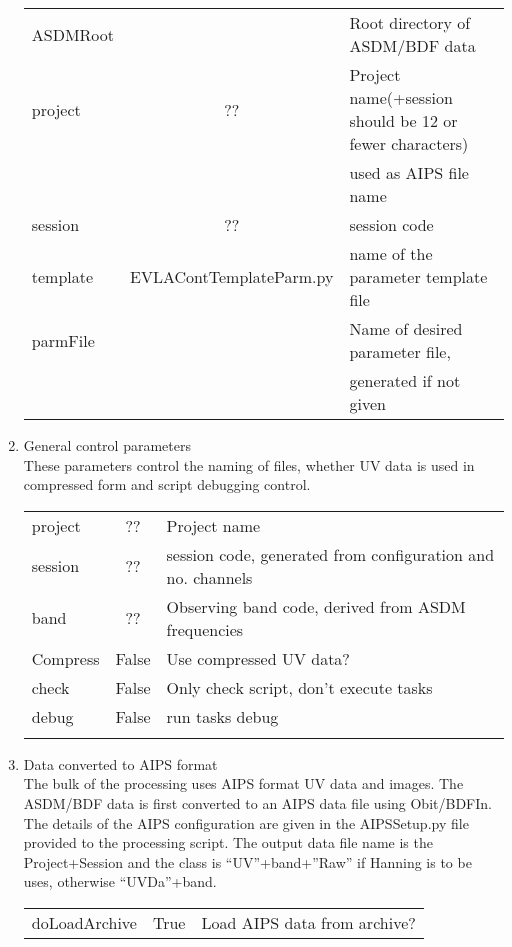 \documentclass[11pt]{article}
\begin{document}
\begin{enumerate}
\begin{center}
\begin{tabular}{|l|c|l|}
\hline
ASDMRoot & & Root directory of ASDM/BDF data\\
project  & ?? &  Project name(+session should be 12 or fewer characters)\\
& &  used as AIPS file name\\
 session & ?? &  session code\\
template & EVLAContTemplateParm.py & name of the parameter template
file\\
parmFile &  & Name of desired parameter file, \\
 & & generated if not given\\
\hline
\end{tabular}
\end{center}
%
\item General control parameters\\
These parameters control the naming of files, whether UV data is used
in compressed form and script debugging control.
\begin{center}
\begin{tabular}{|l|c|l|}
\hline
 project  & ?? &  Project name\\
 session & ?? &  session code, generated from configuration and no. channels\\
 band  & ?? &  Observing band code, derived from ASDM frequencies\\
 Compress & False &  Use compressed UV data?\\
 check & False &  Only check script, don't execute tasks\\
 debug & False &  run tasks debug\\
  &  &  \\
\hline
\end{tabular}
\end{center}
%
\item Data converted to AIPS format\\
The bulk of the processing uses AIPS format UV data and images.
The ASDM/BDF data is first converted to an AIPS data file using Obit/BDFIn.
The details of the AIPS configuration are given in the AIPSSetup.py
file provided to the processing script.
The output data file name is the Project+Session and the class is
``UV''+band+''Raw'' if Hanning is to be uses, otherwise ``UVDa''+band.
\begin{center}
\begin{tabular}{|l|c|l|}
\hline
doLoadArchive  & True & Load AIPS data from archive? \\

\end{tabular}
\end{center}
\end{enumerate}
\end{document}

